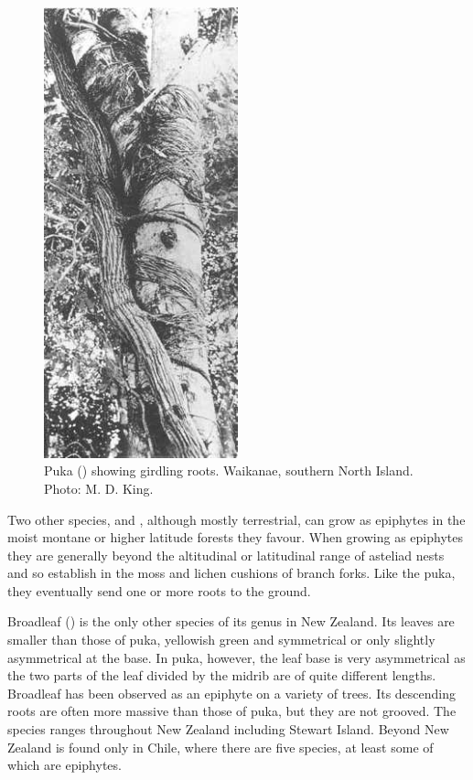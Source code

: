 \begin{figure}
	\includegraphics[width=0.5\textwidth]{graphics/figure48puka-roots.jpg}
	\centering
	\caption[]{Puka () showing girdling roots.
    Waikanae, southern North Island.
	Photo: M. D. King.}
	\label{fig:48puka-roots}
\end{figure}

Two other species,  and , although mostly terrestrial, can grow as epiphytes in the moist montane or higher latitude forests they favour.
When growing as epiphytes they are generally beyond the altitudinal or latitudinal range of asteliad nests and so establish in the moss and lichen cushions of branch forks.
Like the puka, they eventually send one or more roots to the ground.

Broadleaf () is the only other species of its genus in New Zealand.
Its leaves are smaller than those of puka, yellowish green and symmetrical or only slightly asymmetrical at the base.
In puka, however, the leaf base is very asymmetrical as the two parts of the leaf divided by the midrib are of quite different lengths.
Broadleaf has been observed as an epiphyte on a variety of trees.
Its descending roots are often more massive than those of puka, but they are not grooved.
The species ranges throughout New Zealand including Stewart Island.
Beyond New Zealand  is found only in Chile, where there are five species, at least some of which are epiphytes.

